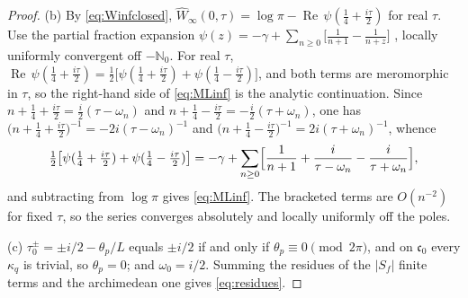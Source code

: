\documentclass[11pt]{amsart}
\theoremstyle{definition}
\theoremstyle{remark}
\newcommand{\N}{\mathbb N}
\newcommand{\Rel}{\operatorname{Re}}
\newcommand{\Wh}{\widehat{W}}
\begin{document}
\begin{proof}
(b)  By \eqref{eq:Winfclosed}, $\Wh_{\infty}(0,\tau)=\log\pi-\Rel\,
\psi(\tfrac14+\tfrac{i\tau}2)$ for real $\tau$.  Use the partial fraction
expansion
$\psi(z)=-\gamma+\sum_{n\ge0}\bigl[\tfrac1{n+1}-\tfrac1{n+z}\bigr]$
\cite[(5.7.6)]{DLMF}, locally uniformly convergent off $-\N_0$.  For real $\tau$,
$\Rel\,\psi(\tfrac14+\tfrac{i\tau}2)=\tfrac12\bigl[\psi(\tfrac14+\tfrac{i\tau}2)
+\psi(\tfrac14-\tfrac{i\tau}2)\bigr]$, and both terms are meromorphic in
$\tau$, so the right-hand side of \eqref{eq:MLinf} is the analytic
continuation.  Since $n+\tfrac14+\tfrac{i\tau}2=\tfrac i2(\tau-\omega_n)$ and
$n+\tfrac14-\tfrac{i\tau}2=-\tfrac i2(\tau+\omega_n)$, one has
$\bigl(n+\tfrac14+\tfrac{i\tau}2\bigr)^{-1}=-2i(\tau-\omega_n)^{-1}$ and
$\bigl(n+\tfrac14-\tfrac{i\tau}2\bigr)^{-1}=2i(\tau+\omega_n)^{-1}$, whence
\[
\tfrac12\bigl[\psi(\tfrac14+\tfrac{i\tau}2)+\psi(\tfrac14-\tfrac{i\tau}2)\bigr]
=-\gamma+\sum_{n\ge0}\Bigl[\frac1{n+1}+\frac{i}{\tau-\omega_n}
-\frac{i}{\tau+\omega_n}\Bigr],
\]
and subtracting from $\log\pi$ gives \eqref{eq:MLinf}.  The bracketed terms are
$O(n^{-2})$ for fixed $\tau$, so the series converges absolutely and locally
uniformly off the poles.

(c)  $\tau_0^{\pm}=\pm i/2-\theta_p/L$ equals $\pm i/2$ if and only if
$\theta_p\equiv0\pmod{2\pi}$, and on $\mathfrak c_0$ every $\kappa_q$ is
trivial, so $\theta_p=0$; and $\omega_0=i/2$.  Summing the residues of the
$|S_f|$ finite terms and the archimedean one gives \eqref{eq:residues}.


\end{proof}
\end{document}
